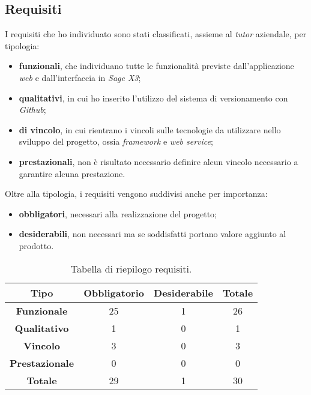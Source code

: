 \subsection{Requisiti}
I requisiti che ho individuato sono stati classificati, assieme al \textit{tutor} aziendale, per tipologia:
\begin{itemize}
	\item \textbf{funzionali}, che individuano tutte le funzionalità previste dall'applicazione \textit{web} e dall'interfaccia in \textit{Sage X3};
	\item \textbf{qualitativi}, in cui ho inserito l'utilizzo del sistema di versionamento con \textit{Github};
	\item \textbf{di vincolo}, in cui rientrano i vincoli sulle tecnologie da utilizzare nello sviluppo del progetto, ossia \textit{framework} e \textit{web service}; 
	\item \textbf{prestazionali}, non è risultato necessario definire alcun vincolo necessario a garantire alcuna prestazione.
\end{itemize}
Oltre alla tipologia, i requisiti vengono suddivisi anche per importanza:
\begin{itemize}
	\item \textbf{obbligatori}, necessari alla realizzazione del progetto;
	\item \textbf{desiderabili}, non necessari ma se soddisfatti portano valore aggiunto al prodotto.
\end{itemize}


\begin{center}
\begin{longtable}{ | c| c | c | c|}
	\caption{Tabella di riepilogo requisiti.}\\
	\hline
	\textbf{Tipo} & \textbf{Obbligatorio} & \textbf{Desiderabile} & \textbf{Totale}\\
	\hline
	\textbf{Funzionale} & 25 & 1 & 26 \\
	\hline
	\textbf{Qualitativo} & 1 & 0 & 1\\
	\hline
	\textbf{Vincolo} & 3 & 0 & 3 \\
	\hline
	\textbf{Prestazionale} & 0 & 0 & 0 \\
	\hline
	\textbf{Totale} & 29 & 1 & 30 \\
	\hline
\end{longtable}
\end{center}

